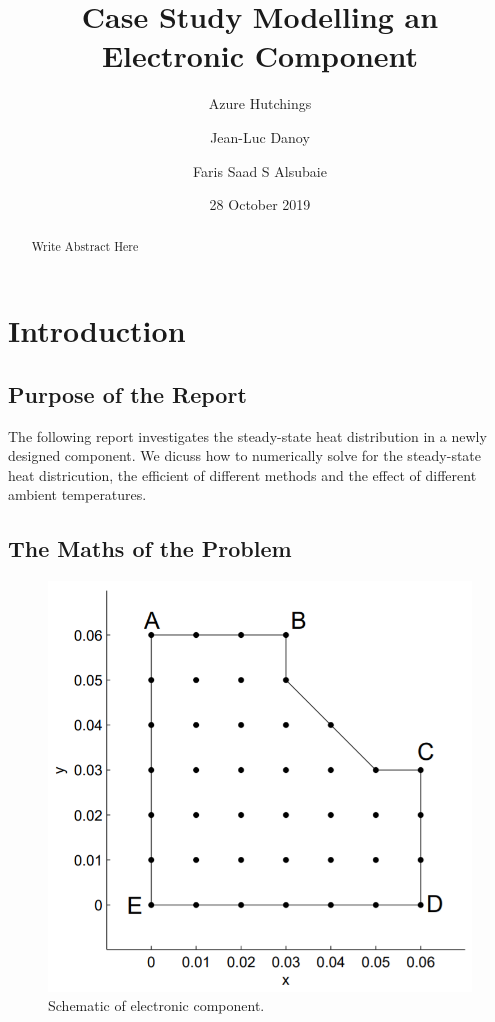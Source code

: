 \documentclass[12pt,a4paper]{article}
\title{Case Study Modelling an Electronic Component}
\author{
  Azure Hutchings
  \and
  Jean-Luc Danoy
  \and
  Faris Saad S Alsubaie
}
\date{28 October 2019}
\begin{document}
 
\begin{titlepage}
\maketitle
\end{titlepage}

\renewcommand{\abstractname}{Executive Summary}
\begin{abstract}
Write Abstract Here
\end{abstract}

\pagebreak

\tableofcontents

\pagebreak

\section{Introduction}

\subsection{Purpose of the Report}
The following report investigates the steady-state heat distribution in a newly designed component. We dicuss how to numerically solve for the steady-state heat districution, the efficient of different methods and the effect of different ambient temperatures.

\subsection{The Maths of the Problem}

\begin{figure}[h!]
	\includegraphics[width=\linewidth]{images/Component.png}
	\caption{Schematic of electronic component.}
	\label{fig:componentSchematic}
\end{figure}
\end{document}
